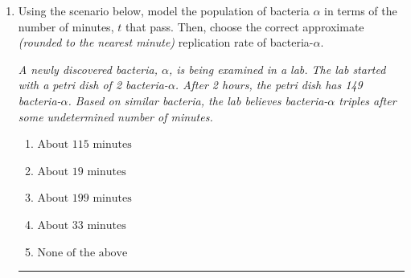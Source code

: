 \documentclass[14pt]{extbook}
\newcommand{\litem}[1]{\item#1\hspace*{-1cm}\rule{\textwidth}{0.4pt}}
\begin{document}
\begin{enumerate}
{\begin{enumerate}[label=\Alph*.]
\end{enumerate} }
\litem{
Using the scenario below, model the population of bacteria $\alpha$ in terms of the number of minutes, $t$ that pass. Then, choose the correct approximate \textit{(rounded to the nearest minute)} replication rate of bacteria-$\alpha$.
\begin{center}
    \textit{ A newly discovered bacteria, $\alpha$, is being examined in a lab. The lab started with a petri dish of 2 bacteria-$\alpha$. After 2 hours, the petri dish has 149 bacteria-$\alpha$. Based on similar bacteria, the lab believes bacteria-$\alpha$ triples after some undetermined number of minutes. }
\end{center}
\begin{enumerate}[label=\Alph*.]
\item \( \text{About } 115 \text{ minutes} \)
\item \( \text{About } 19 \text{ minutes} \)
\item \( \text{About } 199 \text{ minutes} \)
\item \( \text{About } 33 \text{ minutes} \)
\item \( \text{None of the above} \)

\end{enumerate} }
\end{enumerate}
\end{document}
